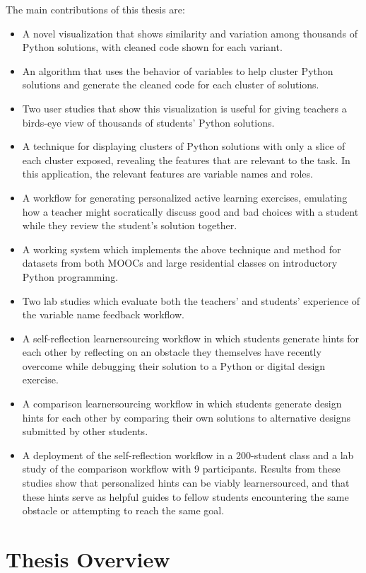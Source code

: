 The main contributions of this thesis are:
\begin{itemize}
\item A novel visualization that shows similarity and variation among thousands of Python solutions, with cleaned code shown for each variant. 
\item An algorithm that uses the behavior of variables to help cluster Python solutions and generate the cleaned code for each cluster of solutions.
\item Two user studies that show this visualization is useful for giving teachers a birds-eye view of thousands of students' Python solutions.
\item A technique for displaying clusters of Python solutions with only a slice of each cluster exposed, revealing the features that are relevant to the task. In this application, the relevant features are variable names and roles.
\item A workflow for generating personalized active learning exercises, emulating how a teacher might socratically discuss good and bad choices with a student while they review the student's solution together.
\item A working system which implements the above technique and method for datasets from both MOOCs and large residential classes on introductory Python programming.
\item Two lab studies which evaluate both the teachers' and students' experience of the variable name feedback workflow.
\item{A self-reflection learnersourcing workflow in which students generate hints for each other by reflecting on an obstacle they themselves have recently overcome while debugging their solution to a Python or digital design exercise.}
\item{A comparison learnersourcing workflow in which students generate design hints for each other by comparing their own solutions to alternative designs submitted by other students.} 
\item{A deployment of the self-reflection workflow in a 200-student class and a lab study of the comparison workflow with 9 participants. Results from these studies show that personalized hints can be viably learnersourced, and that these hints serve as helpful guides to fellow students encountering the same obstacle or attempting to reach the same goal.}
\end{itemize}

\section{Thesis Overview}

